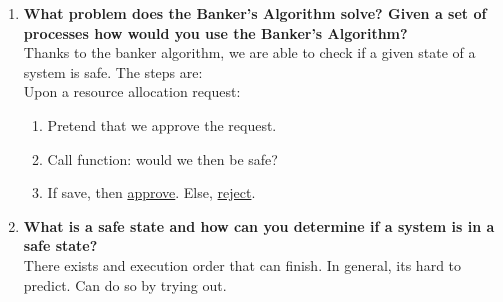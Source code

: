 \documentclass[a4paper]{article}
\begin{document}
\begin{enumerate}
  \item {\bf What problem does the Banker’s Algorithm solve? Given a set of processes how would you use the Banker’s Algorithm? }\\
    Thanks to the banker algorithm, we are able to check if a given state of a system is safe. The steps are:\\
    Upon a resource allocation request:
    \begin{enumerate}
      \item Pretend that we approve the request.
      \item Call function: would we then be safe?
      \item If save, then \underline{approve}. Else, \underline{reject}.
    \end{enumerate}

  \item {\bf What is a safe state and how can you determine if a system is in a safe state? } \\
    There exists and execution order that can finish. In general, its hard to predict. Can do so by trying out.
\end{enumerate}
\end{document}
